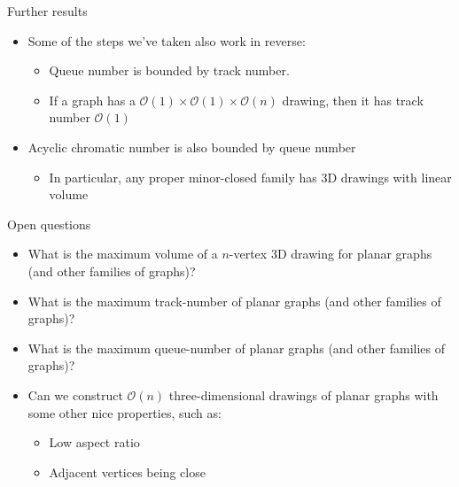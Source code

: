\documentclass[t]{beamer}
\begin{document}
\begin{frame}{Further results}
    \begin{itemize}
	\item Some of the steps we've taken also work in reverse:
	    \begin{itemize}
		\item Queue number is bounded by track number.
		\item If a graph has a $\mathcal O(1) \times \mathcal O(1) \times \mathcal O(n)$ drawing, then it has track number $\mathcal O(1)$
	    \end{itemize}
	\item Acyclic chromatic number is also bounded by queue number
	    \begin{itemize}
		\item In particular, any proper minor-closed family has 3D drawings with linear volume
	    \end{itemize}
    \end{itemize}
    \end{frame}
    \begin{frame}{Open questions}
    \begin{itemize}
	    \pause
	\item What is the maximum volume of a $n$-vertex 3D drawing for planar graphs (and other families of graphs)?
	    \pause
	\item What is the maximum track-number of planar graphs (and other families of graphs)?
	    \pause
	\item What is the maximum queue-number of planar graphs (and other families of graphs)?
	    \pause
	\item Can we construct $\mathcal O(n)$ three-dimensional drawings of planar graphs with some other nice properties, such as: 
	    \pause
	    \begin{itemize}
		\item Low aspect ratio
		    \pause
		\item Adjacent vertices being close
	    \end{itemize}
    \end{itemize}
\end{frame}
\end{document}
